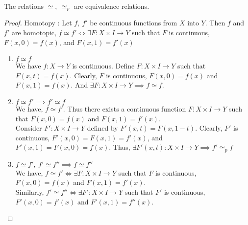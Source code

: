 \begin{proposition}
	The relations $\simeq,\ \simeq_p$ are equivalence relations.
\end{proposition}
\begin{proof}
	Homotopy : Let $f,\ f'$ be continuous functions from $X$ into $Y$.
	Then $f$ and $f'$ are homotopic, $f \simeq f' \iff \exists F : X \times I \to Y$ such that $F$ is continuous, $F(x,0)=f(x)$, and $F(x,1)=f'(x)$
	\begin{enumerate}
		\item $f \simeq f$ \\
			We have $f : X \to Y$ is continuous.
			Define $F : X \times I \to Y$ such that $F(x,t)=f(x)$.
			Clearly, $F$ is continuous, $F(x,0) = f(x)$ and $F(x,1) = f(x)$.
			And $\exists F : X \times I \to Y \implies f \simeq f$.
		\item $f \simeq f' \implies f' \simeq f$\\ We have, $f \simeq f'$.
			Thus there exists a continuous function $F : X \times I \to Y$ such that $F(x,0) = f(x)$ and $F(x,1) = f'(x)$.\\
			Consider $F' : X \times I \to Y$ defined by $F'(x,t) = F(x,1-t)$.
			Clearly, $F'$ is continuous, $F'(x,0) = F(x,1) = f'(x)$, and $F'(x,1) = F(x,0) = f(x)$.
			Thus, $\exists F'(x,t) : X \times I \to Y \implies f' \simeq_p f$
		\item $f \simeq f',\ f' \simeq f'' \implies f \simeq f''$\\
			We have, $f \simeq f' \iff \exists F : X \times I \to Y$ such that $F$ is continuous, $F(x,0) = f(x)$ and $F(x,1) = f'(x)$.\\
			
			Similarly, $f' \simeq f'' \iff \exists F' : X \times I \to Y$ such that $F'$ is continuous, $F'(x,0) = f'(x)$ and $F'(x,1) = f''(x)$.\\


\end{enumerate}
\end{proof}
